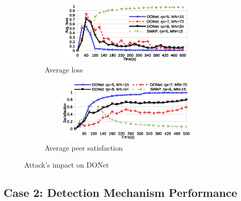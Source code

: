 \begin{figure}[tb]
  \centering
  \begin{subfigure}[c]{0.95\columnwidth}
    \centering
    \includegraphics[width=8.4cm,height=3cm]{./Figures/avg-loss-donet.eps}
    \caption{Average loss}%
    \label{subfig:avg-loss-donet}
  \end{subfigure}
  \begin{subfigure}[c]{0.95\columnwidth}
    \centering
    \includegraphics[width=8.4cm,height=3cm]{./Figures/satisfaction-donet.eps}
    \caption{Average peer satisfaction}%
    \label{subfig:satisfaction-donet}
  \end{subfigure}
  \caption{Attack's impact on DONet}%
  \label{fig:attack-results}
  \vspace{-7mm}
\end{figure}

% 
% 
% 
% 
% 

\subsection{Case 2: Detection Mechanism Performance}


